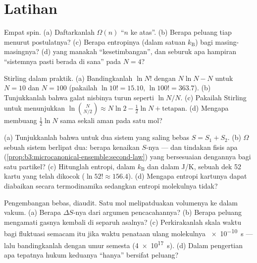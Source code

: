 \section{Latihan}

\begin{exercise}[$\star$]\label{exo:b3:microcanonical-ensemble:1}
Empat spin. (a) Daftarkanlah  $\Omega(n)$ 
``$n$ ke atas''. (b) Berapa peluang tiap  menurut
postulatnya? (c) Berapa entropinya (dalam satuan $k_{\text{B}}$) bagi
masing-masingnya? (d)  yang manakah ``kesetimbangan'', dan
seburuk apa hampiran ``sistemnya pasti berada di sana'' pada $N = 4$?
\end{exercise}

\begin{exercise}[$\star$]\label{exo:b3:microcanonical-ensemble:2}
Stirling dalam praktik. (a) Bandingkanlah $\ln N!$ dengan $N\ln N - N$
untuk $N = 10$ dan $N = 100$ (pakailah $\ln10! = 15.10$,
$\ln100! = 363.7$). (b) Tunjukkanlah bahwa galat nisbinya turun seperti
$\ln N/N$. (c) Pakailah Stirling untuk menunjukkan
$\ln\binom N{N/2} \approx N\ln2 - \tfrac12\ln N + \text{tetapan}$.
(d) Mengapa membuang $\tfrac12\ln N$ sama sekali aman pada satu mol?
\end{exercise}

\begin{exercise}[$\star$]\label{exo:b3:microcanonical-ensemble:3}
(a) Tunjukkanlah bahwa untuk dua sistem yang saling bebas
$S = S_1 + S_2$. (b) $\Omega$ sebuah sistem berlipat dua: berapa
kenaikan $S$-nya --- dan tindakan fisis apa
(\cref{prop:b3:microcanonical-ensemble:second-law}) yang bersesuaian
dengannya bagi satu partikel? (c) Hitunglah entropi, dalam $k_{\text{B}}$
dan dalam J/K, sebuah dek 52 kartu yang telah dikocok
($\ln52! \approx 156.4$). (d) Mengapa entropi kartunya dapat diabaikan
secara termodinamika sedangkan entropi molekulnya tidak?
\end{exercise}

\begin{exercise}[$\star$]\label{exo:b3:microcanonical-ensemble:4}
Pengembangan bebas, diaudit. Satu mol melipatduakan volumenya ke dalam
vakum. (a) Berapa $\Delta S$-nya dari argumen pencacahannya? (b) Berapa
peluang mengamati gasnya kembali di separuh asalnya? (c)
Perkirakanlah skala waktu bagi fluktuasi semacam itu jika waktu penataan
ulang molekulnya \qty{e-10}{s} --- lalu bandingkanlah dengan umur
semesta (\qty{4e17}{s}). (d) Dalam pengertian apa tepatnya hukum
keduanya ``hanya'' bersifat peluang?
\end{exercise}

